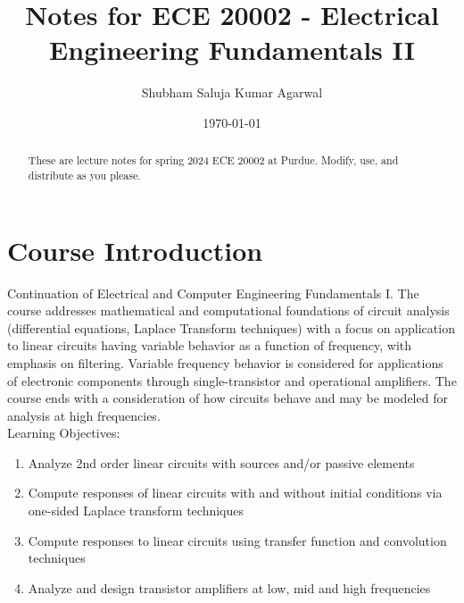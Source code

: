 \documentclass[nobib]{tufte-handout}
\title{Notes for ECE 20002 - Electrical Engineering Fundamentals II}
\author[Shubham Saluja Kumar Agarwal]{Shubham Saluja Kumar Agarwal}
\date{\today}  %
\begin{document}
\maketitle

\begin{abstract}
These are lecture notes for spring 2024 ECE 20002 at Purdue. Modify, use, and distribute as you please.
\end{abstract}

\tableofcontents

\section{Course Introduction}

Continuation of Electrical and Computer Engineering Fundamentals I. The course addresses
mathematical and computational foundations of circuit analysis (differential equations, Laplace Transform techniques) with a focus on application to linear circuits having variable behavior as a function of frequency, with emphasis on filtering. Variable frequency behavior is considered for applications of electronic components through single-transistor and operational amplifiers. The course ends with a consideration of how circuits behave and may be modeled for analysis at high frequencies.\\
Learning Objectives:
\begin{enumerate}
    \item Analyze 2nd order linear circuits with sources and/or passive elements
    \item Compute responses of linear circuits with and without initial conditions via one-sided Laplace transform techniques
    \item Compute responses to linear circuits using transfer function and convolution techniques
    \item Analyze and design transistor amplifiers at low, mid and high frequencies
\end{enumerate}

\pagebreak 
\end{document}
